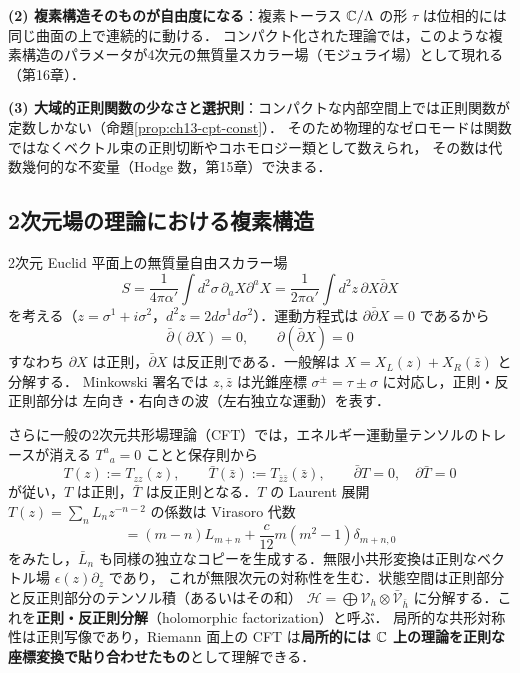 \textbf{(2) 複素構造そのものが自由度になる}：複素トーラス $\mathbb{C}/\Lambda$ の形 $\tau$ は位相的には同じ曲面の上で連続的に動ける．
コンパクト化された理論では，このような複素構造のパラメータが4次元の無質量スカラー場（モジュライ場）として現れる
（第16章）．

\textbf{(3) 大域的正則関数の少なさと選択則}：コンパクトな内部空間上では正則関数が定数しかない（命題\ref{prop:ch13-cpt-const}）．
そのため物理的なゼロモードは関数ではなくベクトル束の正則切断やコホモロジー類として数えられ，
その数は代数幾何的な不変量（Hodge 数，第15章）で決まる．

\subsection{2次元場の理論における複素構造}

2次元 Euclid 平面上の無質量自由スカラー場
\begin{equation}
  S = \frac{1}{4\pi\alpha'}\int d^2\sigma\,\partial_a X\partial^a X = \frac{1}{2\pi\alpha'}\int d^2z\,\partial X\bar\partial X
\end{equation}
を考える（$z=\sigma^1+i\sigma^2$，$d^2z=2d\sigma^1d\sigma^2$）．運動方程式は $\partial\bar\partial X=0$ であるから
\begin{equation}
  \bar\partial(\partial X)=0,\qquad \partial(\bar\partial X)=0
\end{equation}
すなわち $\partial X$ は正則，$\bar\partial X$ は反正則である．一般解は $X = X_L(z)+X_R(\bar z)$ と分解する．
Minkowski 署名では $z,\bar z$ は光錐座標 $\sigma^\pm=\tau\pm\sigma$ に対応し，正則・反正則部分は
左向き・右向きの波（左右独立な運動）を表す．

さらに一般の2次元共形場理論（CFT）では，エネルギー運動量テンソルのトレースが消える $T^a{}_a=0$ ことと保存則から
\begin{equation}
  T(z) := T_{zz}(z),\qquad \bar T(\bar z):=T_{\bar z\bar z}(\bar z),\qquad \bar\partial T=0,\quad \partial\bar T=0
\end{equation}
が従い，$T$ は正則，$\bar T$ は反正則となる．$T$ の Laurent 展開 $T(z)=\sum_n L_n z^{-n-2}$ の係数は
Virasoro 代数
\begin{equation}
  [L_m,L_n] = (m-n)L_{m+n} + \frac{c}{12}m(m^2-1)\delta_{m+n,0}
\end{equation}
をみたし，$\bar L_n$ も同様の独立なコピーを生成する．無限小共形変換は正則なベクトル場 $\epsilon(z)\partial_z$ であり，
これが無限次元の対称性を生む．状態空間は正則部分と反正則部分のテンソル積（あるいはその和）
$\mathcal{H}=\bigoplus\mathcal{V}_h\otimes\bar{\mathcal{V}}_{\bar h}$ に分解する．これを\textbf{正則・反正則分解}（holomorphic factorization）と呼ぶ．
局所的な共形対称性は正則写像であり，Riemann 面上の CFT は\textbf{局所的には $\mathbb{C}$ 上の理論を正則な座標変換で貼り合わせたもの}として理解できる．

